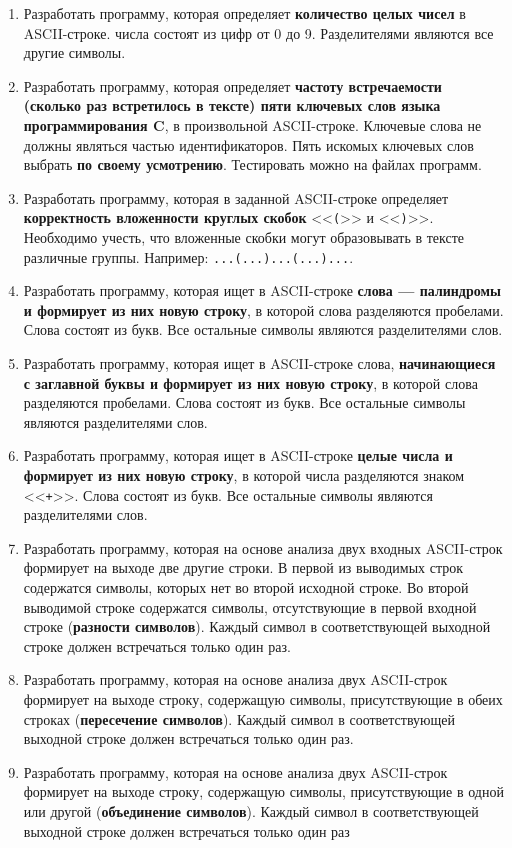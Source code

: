 \begin{enumerate}
    \item Разработать программу, которая определяет \textbf{количество целых чисел} в ASCII-строке. числа состоят из цифр от 0 до 9. Разделителями являются все другие символы.
    \item Разработать программу, которая определяет \textbf{частоту встречаемости (сколько раз встретилось в тексте) пяти ключевых слов языка программирования C}, в произвольной  ASCII-строке. Ключевые слова не должны являться частью идентификаторов. Пять искомых ключевых слов выбрать \textbf{по своему усмотрению}. Тестировать можно на файлах программ.
    \item Разработать программу, которая в заданной ASCII-строке определяет \textbf{корректность вложенности круглых скобок} <<\verb|(|>> и <<\verb|)|>>. Необходимо учесть, что вложенные скобки могут образовывать в тексте различные группы. Например: \verb|...(...)...(...)...|.
    \item Разработать программу, которая ищет в ASCII-строке \textbf{слова --- палиндромы и формирует из них новую строку}, в которой слова разделяются пробелами. Слова состоят из букв. Все остальные символы являются разделителями слов.
    \item Разработать программу, которая ищет в ASCII-строке слова, \textbf{начинающиеся с заглавной буквы и формирует из них новую строку}, в которой слова разделяются пробелами. Слова состоят из букв. Все остальные символы являются разделителями слов.
    \item Разработать программу, которая ищет в ASCII-строке \textbf{целые числа и формирует из них новую строку}, в которой числа разделяются знаком <<\verb|+|>>. Слова состоят из букв. Все остальные символы являются разделителями слов.
    \item Разработать программу, которая на основе анализа двух входных ASCII-строк формирует на выходе две другие строки. В первой из выводимых строк содержатся символы, которых нет во второй исходной строке. Во второй выводимой строке содержатся символы, отсутствующие в первой входной строке (\textbf{разности символов}). Каждый символ в соответствующей выходной строке должен встречаться только один раз.
    \item Разработать программу, которая на основе анализа двух ASCII-строк формирует на выходе строку, содержащую символы, присутствующие в обеих строках (\textbf{пересечение символов}). Каждый символ в соответствующей выходной строке должен встречаться только один раз.
    \item Разработать программу, которая на основе анализа двух ASCII-строк формирует на выходе строку, содержащую символы, присутствующие в одной или другой (\textbf{объединение символов}). Каждый символ в соответствующей выходной строке должен встречаться только один раз
\end{enumerate}
